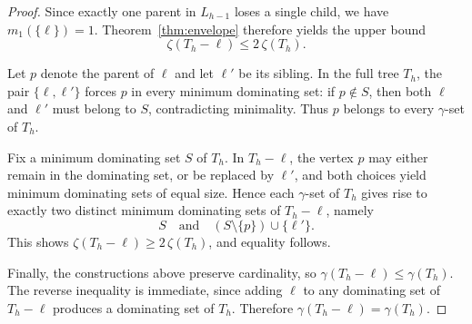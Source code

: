 \documentclass[11pt]{article}
\theoremstyle{definition}
\theoremstyle{remark}
\begin{document}
\begin{proof}
Since exactly one parent in $L_{h-1}$ loses a single child, we have $m_1(\{\ell\})=1$.
Theorem~\ref{thm:envelope} therefore yields the upper bound
\[
\zeta(T_h-\ell)\le 2\,\zeta(T_h).
\]

Let $p$ denote the parent of $\ell$ and let $\ell'$ be its sibling.
In the full tree $T_h$, the pair $\{\ell,\ell'\}$ forces $p$ in every minimum dominating set:
if $p\notin S$, then both $\ell$ and $\ell'$ must belong to $S$, contradicting minimality.
Thus $p$ belongs to every $\gamma$-set of $T_h$.

Fix a minimum dominating set $S$ of $T_h$.
In $T_h-\ell$, the vertex $p$ may either remain in the dominating set, or be replaced by $\ell'$,
and both choices yield minimum dominating sets of equal size.
Hence each $\gamma$-set of $T_h$ gives rise to exactly two distinct minimum dominating sets of $T_h-\ell$,
namely
\[
S
\quad\text{and}\quad
(S\setminus\{p\})\cup\{\ell'\}.
\]
This shows $\zeta(T_h-\ell)\ge 2\,\zeta(T_h)$, and equality follows.

Finally, the constructions above preserve cardinality, so $\gamma(T_h-\ell)\le\gamma(T_h)$.
The reverse inequality is immediate, since adding $\ell$ to any dominating set of $T_h-\ell$
produces a dominating set of $T_h$.
Therefore $\gamma(T_h-\ell)=\gamma(T_h)$.
\end{proof}
\end{document}
